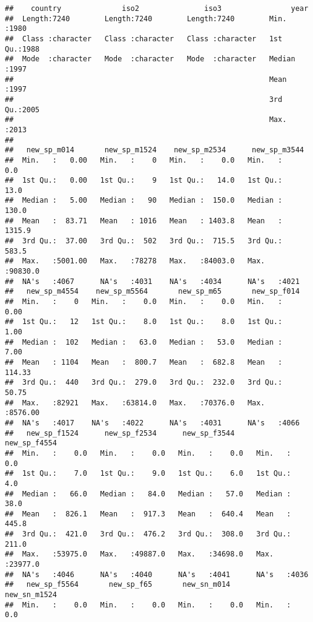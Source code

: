\documentclass[]{article}
\begin{document}
\begin{verbatim}
##    country              iso2               iso3                year     
##  Length:7240        Length:7240        Length:7240        Min.   :1980  
##  Class :character   Class :character   Class :character   1st Qu.:1988  
##  Mode  :character   Mode  :character   Mode  :character   Median :1997  
##                                                           Mean   :1997  
##                                                           3rd Qu.:2005  
##                                                           Max.   :2013  
##                                                                         
##   new_sp_m014       new_sp_m1524    new_sp_m2534      new_sp_m3544    
##  Min.   :   0.00   Min.   :    0   Min.   :    0.0   Min.   :    0.0  
##  1st Qu.:   0.00   1st Qu.:    9   1st Qu.:   14.0   1st Qu.:   13.0  
##  Median :   5.00   Median :   90   Median :  150.0   Median :  130.0  
##  Mean   :  83.71   Mean   : 1016   Mean   : 1403.8   Mean   : 1315.9  
##  3rd Qu.:  37.00   3rd Qu.:  502   3rd Qu.:  715.5   3rd Qu.:  583.5  
##  Max.   :5001.00   Max.   :78278   Max.   :84003.0   Max.   :90830.0  
##  NA's   :4067      NA's   :4031    NA's   :4034      NA's   :4021     
##   new_sp_m4554    new_sp_m5564       new_sp_m65       new_sp_f014     
##  Min.   :    0   Min.   :    0.0   Min.   :    0.0   Min.   :   0.00  
##  1st Qu.:   12   1st Qu.:    8.0   1st Qu.:    8.0   1st Qu.:   1.00  
##  Median :  102   Median :   63.0   Median :   53.0   Median :   7.00  
##  Mean   : 1104   Mean   :  800.7   Mean   :  682.8   Mean   : 114.33  
##  3rd Qu.:  440   3rd Qu.:  279.0   3rd Qu.:  232.0   3rd Qu.:  50.75  
##  Max.   :82921   Max.   :63814.0   Max.   :70376.0   Max.   :8576.00  
##  NA's   :4017    NA's   :4022      NA's   :4031      NA's   :4066     
##   new_sp_f1524      new_sp_f2534      new_sp_f3544      new_sp_f4554    
##  Min.   :    0.0   Min.   :    0.0   Min.   :    0.0   Min.   :    0.0  
##  1st Qu.:    7.0   1st Qu.:    9.0   1st Qu.:    6.0   1st Qu.:    4.0  
##  Median :   66.0   Median :   84.0   Median :   57.0   Median :   38.0  
##  Mean   :  826.1   Mean   :  917.3   Mean   :  640.4   Mean   :  445.8  
##  3rd Qu.:  421.0   3rd Qu.:  476.2   3rd Qu.:  308.0   3rd Qu.:  211.0  
##  Max.   :53975.0   Max.   :49887.0   Max.   :34698.0   Max.   :23977.0  
##  NA's   :4046      NA's   :4040      NA's   :4041      NA's   :4036     
##   new_sp_f5564       new_sp_f65       new_sn_m014       new_sn_m1524    
##  Min.   :    0.0   Min.   :    0.0   Min.   :    0.0   Min.   :    0.0  

\end{verbatim}
\end{document}
